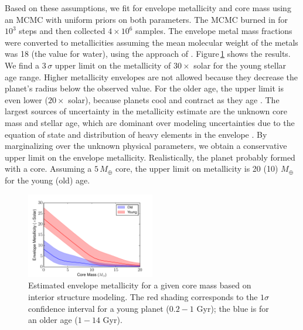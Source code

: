 \documentclass[twocolumn, trackchanges]{aastex61}
\begin{document}
Based on these assumptions, we fit for envelope metallicity and core mass using an MCMC with uniform priors on both parameters.  The MCMC burned in for $10^3$ steps and then collected $4\times10^6$ samples.  The envelope metal mass fractions were converted to metallicities assuming the mean molecular weight of the metals was 18 (the value for water), using the approach of \cite{fortney13}. Figure\,\ref{fig:metal_prior} shows the results.  We find a $3\,\sigma$ upper limit on the metallicity of $30\times$ solar for the young stellar age range.  Higher metallicity envelopes are not allowed because they decrease the planet's radius below the observed value.  For the older age, the upper limit is even lower ($20\times$ solar), because planets cool and contract as they age \citep{fortney08}.  The largest sources of uncertainty in the metallicity estimate are the unknown core mass and stellar age, which are dominant over modeling uncertainties due to the equation of state and distribution of heavy elements in the envelope \citep{thorngren16}. By marginalizing over the unknown physical parameters, we obtain a conservative upper limit on the envelope metallicity.  Realistically, the planet probably formed with a core. Assuming a $5\,M_\oplus$ core, the upper limit on metallicity is 20 (10) $M_\oplus$ for the young (old) age.  

\begin{figure}
\includegraphics[width = 0.5\textwidth]{fig3_metallicity.pdf}
\caption{Estimated envelope metallicity for a given core mass based on interior structure modeling. The red shading corresponds to the $1\sigma$ confidence interval for a young planet ($0.2-1$ Gyr); the blue is for an older age ($1-14$ Gyr).}
\label{fig:metal_prior}
\end{figure}
\end{document}
